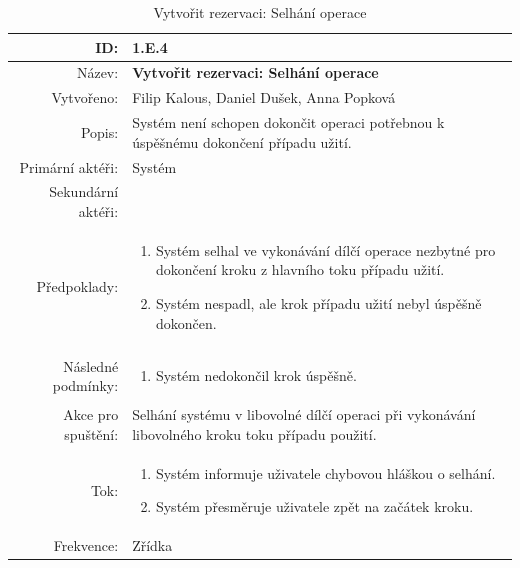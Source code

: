 \newpage 
\begin{center}
\begin{table}[ht!]
{\renewcommand{\arraystretch}{1.3}
\begin{tabular}{| r | p{12cm} |}
	\hline
	ID: & 1.E.4 \\
    \hline
    Název: & \textbf{Vytvořit rezervaci: Selhání operace} \\
    \hline
    Vytvořeno: & Filip Kalous, Daniel Dušek, Anna Popková \\
    \hline
    Popis: & Systém není schopen dokončit operaci potřebnou k úspěšnému dokončení případu užití. \\
    \hline
    Primární aktéři: & Systém \\
    \hline
    Sekundární aktéři: &  \\
    \hline
    Předpoklady: & 
    \begin{minipage}[t]{0.75\textwidth}
    	\begin{enumerate}[nosep,after=\strut]
    		\item Systém selhal ve vykonávání dílčí operace nezbytné pro dokončení kroku z hlavního toku případu užití.
            \item Systém nespadl, ale krok případu užití nebyl úspěšně dokončen.
    	\end{enumerate}
  	\end{minipage} \\
    \hline
    Následné podmínky: & 
    \begin{minipage}[t]{0.75\textwidth}
    	\begin{enumerate}[nosep,after=\strut]
    		\item Systém nedokončil krok úspěšně.
    	\end{enumerate}
  	\end{minipage} \\
	\hline
    Akce pro spuštění: & Selhání systému v libovolné dílčí operaci při vykonávání libovolného kroku toku případu použití. \\
    \hline
    Tok: & 
    \begin{minipage}[t]{0.75\textwidth}
    	\begin{enumerate}[nosep,after=\strut]
            \item Systém informuje uživatele chybovou hláškou o selhání.
            \item Systém přesměruje uživatele zpět na začátek kroku.
    	\end{enumerate}
  	\end{minipage} \\
    \hline
    Frekvence: & Zřídka \\
    \hline
\end{tabular}}
\caption{Vytvořit rezervaci: Selhání operace}
\label{table:4}
\end{table}
\end{center}


